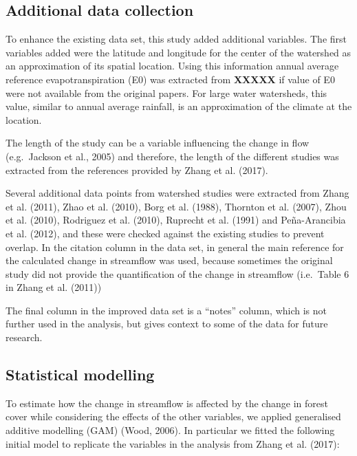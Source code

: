 \documentclass[]{elsarticle} %
\begin{document}
\hypertarget{additional-data-collection}{%
\subsection{Additional data
collection}\label{additional-data-collection}}

To enhance the existing data set, this study added additional variables.
The first variables added were the latitude and longitude for the center
of the watershed as an approximation of its spatial location. Using this
information annual average reference evapotranspiration (E0) was
extracted from \textbf{XXXXX} if value of E0 were not available from the
original papers. For large water watersheds, this value, similar to
annual average rainfall, is an approximation of the climate at the
location.

The length of the study can be a variable influencing the change in flow
(e.g.~Jackson et al., 2005) and therefore, the length of the different
studies was extracted from the references provided by Zhang et al.
(2017).

Several additional data points from watershed studies were extracted
from Zhang et al. (2011), Zhao et al. (2010), Borg et al. (1988),
Thornton et al. (2007), Zhou et al. (2010), Rodriguez et al. (2010),
Ruprecht et al. (1991) and Peña-Arancibia et al. (2012), and these were
checked against the existing studies to prevent overlap. In the citation
column in the data set, in general the main reference for the calculated
change in streamflow was used, because sometimes the original study did
not provide the quantification of the change in streamflow (i.e.~Table 6
in Zhang et al. (2011))

The final column in the improved data set is a ``notes'' column, which
is not further used in the analysis, but gives context to some of the
data for future research.

\hypertarget{statistical-modelling}{%
\subsection{Statistical modelling}\label{statistical-modelling}}

To estimate how the change in streamflow is affected by the change in
forest cover while considering the effects of the other variables, we
applied generalised additive modelling (GAM) (Wood, 2006). In particular
we fitted the following initial model to replicate the variables in the
analysis from Zhang et al. (2017):
\end{document}
